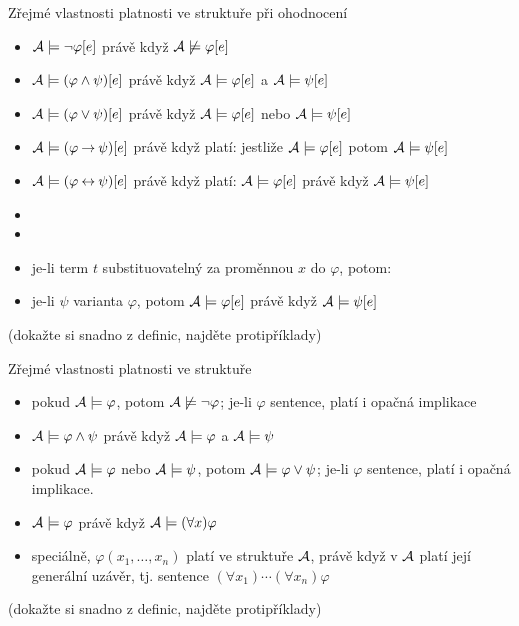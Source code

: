 \documentclass{beamer}
\begin{document}
\begin{frame}{Zřejmé vlastnosti platnosti ve struktuře při ohodnocení}

    \begin{itemize}
        \item $\mathcal{A}\models\neg\varphi[e]$ právě když $\mathcal{A}\not\models\varphi[e]$
        \item $\mathcal{A}\models(\varphi\land\psi)[e]$ právě když $\mathcal{A}\models\varphi[e]$ a $\mathcal{A}\models\psi[e]$
        \item $\mathcal{A}\models(\varphi\lor\psi)[e]$ právě když $\mathcal{A}\models\varphi[e]$ nebo $\mathcal{A}\models\psi[e]$
        \item $\mathcal{A}\models(\varphi\mathbin{\rightarrow}\psi)[e]$ právě když platí: jestliže $\mathcal{A}\models\varphi[e]$ potom $\mathcal{A} \models\psi[e]$
        \item $\mathcal{A}\models(\varphi\mathbin{\leftrightarrow}\psi)[e]$ právě když platí: $\mathcal{A}\models\varphi[e]$ právě když $\mathcal{A}\models\psi[e]
        $
        \item {}
        \item {}
        \item je-li term $t$ substituovatelný za proměnnou $x$ do $\varphi$, potom:
        \item je-li $\psi$ varianta $\varphi$, potom $\mathcal{A}\models\varphi[e]$ právě když $\mathcal{A}\models\psi[e]$
    \end{itemize}

    (dokažte si snadno z definic, najděte protipříklady)  

\end{frame}


\begin{frame}{Zřejmé vlastnosti platnosti ve struktuře}

    \begin{itemize}
        \item pokud $\mathcal{A}\models\varphi$, potom $\mathcal{A}\not\models\neg\varphi$; je-li $\varphi$ sentence, platí i opačná implikace
        \item $\mathcal{A}\models\varphi\land\psi$ právě když $\mathcal{A}\models\varphi$ a $\mathcal{A}\models\psi$
        \item pokud $\mathcal{A}\models\varphi$ nebo $\mathcal{A}\models\psi$, potom $\mathcal{A}\models\varphi\lor\psi$; je-li $\varphi$ sentence,  platí i opačná implikace.
        \item $\mathcal{A}\models\varphi$ právě když $\mathcal{A}\models
        (\forall x)\varphi$
        \item speciálně, $\varphi(x_1,\dots,x_n)$ platí ve struktuře $\mathcal{A}$, právě když v $\mathcal{A}$ platí její \alert{generální uzávěr}, tj. sentence $(\forall x_1)\cdots(\forall x_n)\varphi$ 
    \end{itemize}

    (dokažte si snadno z definic, najděte protipříklady)

\end{frame}
\end{document}
